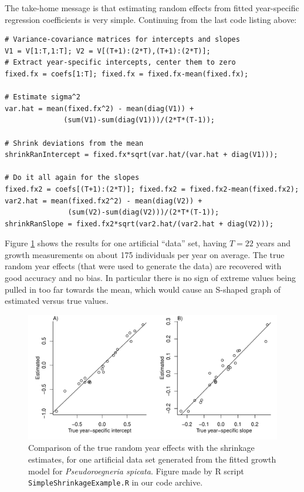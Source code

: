 \documentclass[12pt]{article}
\begin{document}
\begin{spacing}{1.35}
The take-home message is that estimating random effects from fitted year-specific regression 
coefficients is very simple. Continuing from the last code listing above: 
\begin{lstlisting}
# Variance-covariance matrices for intercepts and slopes
V1 = V[1:T,1:T]; V2 = V[(T+1):(2*T),(T+1):(2*T)]; 
# Extract year-specific intercepts, center them to zero   
fixed.fx = coefs[1:T]; fixed.fx = fixed.fx-mean(fixed.fx); 

# Estimate sigma^2
var.hat = mean(fixed.fx^2) - mean(diag(V1)) + 
              (sum(V1)-sum(diag(V1)))/(2*T*(T-1)); 

# Shrink deviations from the mean 
shrinkRanIntercept = fixed.fx*sqrt(var.hat/(var.hat + diag(V1)));

# Do it all again for the slopes 
fixed.fx2 = coefs[(T+1):(2*T)]; fixed.fx2 = fixed.fx2-mean(fixed.fx2); 
var2.hat = mean(fixed.fx2^2) - mean(diag(V2)) + 
               (sum(V2)-sum(diag(V2)))/(2*T*(T-1)); 
shrinkRanSlope = fixed.fx2*sqrt(var2.hat/(var2.hat + diag(V2))); 
\end{lstlisting}

Figure \ref{fig:compareShrinkage} shows the results for one artificial ``data'' set, having $T=22$ years and growth measurements on 
about 175 individuals per year on average. The true random year effects (that were used to generate the data) are recovered
with good accuracy and no bias. In particular there is no sign of extreme values being pulled in too far
towards the mean, which would cause an S-shaped graph of estimated versus true values. 

\begin{figure}[tbp]
\centerline{\includegraphics[width=\textwidth]{figures/SimpleShrinkage.pdf}}
\caption{Comparison of the true random year effects with the shrinkage estimates, for one artificial data set
generated from the fitted growth model for  \emph{Pseudoroegneria spicata}. Figure made by R script 
\texttt{SimpleShrinkageExample.R} in our code archive.} 
\label{fig:compareShrinkage}
\end{figure}



\end{spacing}
\end{document}
